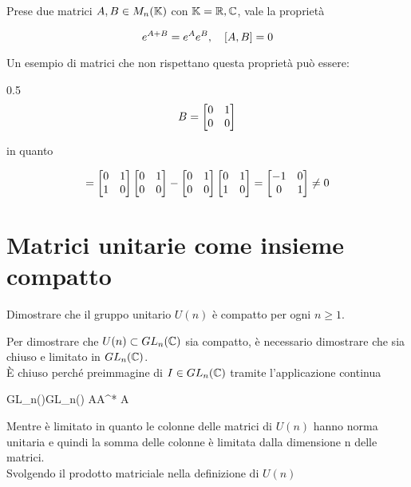 Prese due matrici $ A,B \in M_{n}(\mathbb{K}) $ con $ \mathbb{K} = \mathbb{R}, \mathbb{C} $, vale la proprietà

\begin{equation}
	e^{A+B} = e^{A} e^{B} \qcomma [A,B] = 0
\end{equation}

Un esempio di matrici che non rispettano questa proprietà può essere:

	{0.5}{%
			\begin{equation}
				B = \bmqty{ %
							0 & 1 \\
							0 & 0 %
							}
			\end{equation}
			}

in quanto

\begin{equation}
	[A,B] = %
	\bmqty{ 0 & 1 \\ 1 & 0 } \bmqty{ 0 & 1 \\ 0 & 0 } - \bmqty{ 0 & 1 \\ 0 & 0 }  \bmqty{ 0 & 1 \\ 1 & 0 } %
	= \bmqty{ -1 & 0 \\ 0 & 1 } %
	\neq 0
\end{equation}

%

\newpage

%

\section{Matrici unitarie come insieme compatto}\label{es3-5}

\begin{tcolorbox}
	Dimostrare che il gruppo unitario $ U(n) $ è compatto per ogni $ n \geqslant 1 $.
\end{tcolorbox}

Per dimostrare che $ U(n) \subset GL_{n}(\mathbb{C}) $ sia compatto, è necessario dimostrare che sia chiuso e limitato in $ GL_{n}(\mathbb{C}) $.\\
È chiuso perché preimmagine di $ I \in GL_{n}(\mathbb{C}) $ tramite l'applicazione continua

	{GL_{n}(\C)}{GL_{n}(\C)}
	{A}{A^{*} A}


Mentre è limitato in quanto le colonne delle matrici di $ U(n) $ hanno norma unitaria e quindi la somma delle colonne è limitata dalla dimensione n delle matrici.\\
Svolgendo il prodotto matriciale nella definizione di $ U(n) $

